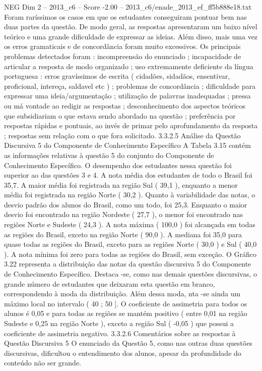 \begin{textsample}{NEG Dim 2 – 2013\_c6 – Score -2.00 – 2013\_c6/enade\_2013\_ef\_ff5b888e18.txt}
Foram raríssimos os casos em que os estudantes conseguiram pontuar bem nas duas partes da questão.
De modo geral, as respostas apresentaram um baixo nível teórico e uma grande dificuldade de expressar as ideias.
Além disso, mais uma vez os erros gramaticais e de concordância foram muito excessivos.
Os principais problemas detectados foram : incompreensão do enunciado ; incapacidade de articular a resposta de modo organizado ; uso extremamente deficiente da língua portuguesa : erros gravíssimos de escrita ( cidadões, sidadãos, ensentivar, proficional, intereça, saldavel etc ) ; problemas de concordância ; dificuldade para expressar uma ideia/argumentação ; utilização de palavras inadequadas ; pressa ou má vontade ao redigir as respostas ; desconhecimento dos aspectos teóricos que subsidiariam o que estava sendo abordado na questão ; preferência por respostas rápidas e pontuais, ao invés de primar pelo aprofundamento da resposta ; respostas sem relação com o que fora solicitado. 3.3.2.5 Análise da Questão Discursiva 5 do Componente de Conhecimento Específico A Tabela 3.15 contém as informações relativas à questão 5 do conjunto do Componente de Conhecimento Específico.
O desempenho dos estudantes nessa questão foi superior ao das questões 3 e 4.
A nota média dos estudantes de todo o Brasil foi 35,7.
A maior média foi registrada na região Sul ( 39,1 ), enquanto a menor média foi registrada na região Norte ( 30,2 ).
Quanto à variabilidade das notas, o desvio padrão dos alunos do Brasil, como um todo, foi 25,3.
Enquanto o maior desvio foi encontrado na região Nordeste ( 27,7 ), o menor foi encontrado nas regiões Norte e Sudeste ( 24,3 ).
A nota máxima ( 100,0 ) foi alcançada em todas as regiões do Brasil, exceto na região Norte ( 90,0 ).
A mediana foi 35,0 para quase todas as regiões do Brasil, exceto para as regiões Norte ( 30,0 ) e Sul ( 40,0 ).
A nota mínima foi zero para todas as regiões do Brasil, sem exceção.
O Gráfico 3.22 representa a distribuição das notas da questão discursiva 5 do Componente de Conhecimento Específico.
Destaca -se, como nas demais questões discursivas, o grande número de estudantes que deixaram esta questão em branco, correspondendo à moda da distribuição.
Além dessa moda, nta -se ainda um máximo local no intervalo ( 40 ; 50 ].
O coeficiente de assimetria para todos os alunos é 0,05 e para todas as regiões se mantém positivo ( entre 0,01 na região Sudeste e 0,25 na região Norte ), exceto a região Sul ( -0,05 ) que possui a coeficiente de assimetria negativo. 3.3.2.6 Comentários sobre as respostas à Questão Discursiva 5 O enunciado da Questão 5, como nas outras duas questões discursivas, dificultou o entendimento dos alunos, apesar da profundidade do conteúdo não ser grande.

\end{textsample}
